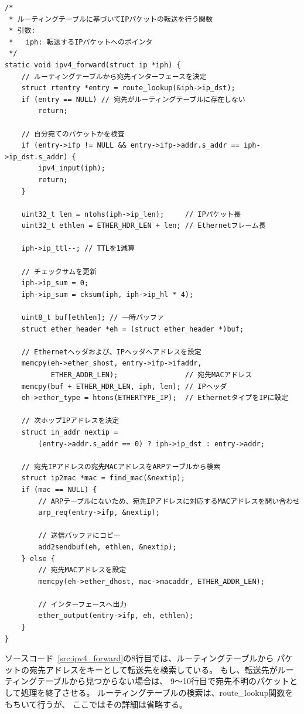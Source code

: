 \begin{lstlisting}[caption=ipv4\_forward関数,label=src:ipv4_forward]
/*
 * ルーティングテーブルに基づいてIPパケットの転送を行う関数
 * 引数:
 *   iph: 転送するIPパケットへのポインタ
 */
static void ipv4_forward(struct ip *iph) {
    // ルーティングテーブルから宛先インターフェースを決定
    struct rtentry *entry = route_lookup(&iph->ip_dst);
    if (entry == NULL) // 宛先がルーティングテーブルに存在しない
        return;

    // 自分宛てのパケットかを検査
    if (entry->ifp != NULL && entry->ifp->addr.s_addr == iph->ip_dst.s_addr) {
        ipv4_input(iph);
        return;
    }

    uint32_t len = ntohs(iph->ip_len);     // IPパケット長
    uint32_t ethlen = ETHER_HDR_LEN + len; // Ethernetフレーム長

    iph->ip_ttl--; // TTLを1減算

    // チェックサムを更新
    iph->ip_sum = 0;
    iph->ip_sum = cksum(iph, iph->ip_hl * 4);

    uint8_t buf[ethlen]; // 一時バッファ
    struct ether_header *eh = (struct ether_header *)buf;

    // Ethernetヘッダおよび、IPヘッダへアドレスを設定
    memcpy(eh->ether_shost, entry->ifp->ifaddr,
           ETHER_ADDR_LEN);                // 宛先MACアドレス
    memcpy(buf + ETHER_HDR_LEN, iph, len); // IPヘッダ
    eh->ether_type = htons(ETHERTYPE_IP);  // EthernetタイプをIPに設定

    // 次ホップIPアドレスを決定
    struct in_addr nextip =
        (entry->addr.s_addr == 0) ? iph->ip_dst : entry->addr;

    // 宛先IPアドレスの宛先MACアドレスをARPテーブルから検索
    struct ip2mac *mac = find_mac(&nextip);
    if (mac == NULL) {
        // ARPテーブルにないため、宛先IPアドレスに対応するMACアドレスを問い合わせ
        arp_req(entry->ifp, &nextip);

        // 送信バッファにコピー
        add2sendbuf(eh, ethlen, &nextip);
    } else {
        // 宛先MACアドレスを設定
        memcpy(eh->ether_dhost, mac->macaddr, ETHER_ADDR_LEN);

        // インターフェースへ出力
        ether_output(entry->ifp, eh, ethlen);
    }
}
\end{lstlisting}

ソースコード~\ref{src:ipv4_forward}の8行目では、ルーティングテーブルから
パケットの宛先アドレスをキーとして転送先を検索している。
もし、転送先がルーティングテーブルから見つからない場合は、
9〜10行目で宛先不明のパケットとして処理を終了させる。
ルーティングテーブルの検索は、route\_lookup関数をもちいて行うが、
ここではその詳細は省略する。

